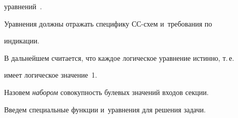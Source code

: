 урав\-не\-ний~\cite{8-pl}.


   


   Уравнения должны отражать специфику СС-схем и~требования по 


индикации.


   


   В дальнейшем считается, что каждое логическое уравнение истинно, т.\,е.\ 


имеет логическое значение~1.


   


   Назовем \textit{набором} совокупность булевых значений входов секции.


   


   Введем специальные функции и~уравнения для решения задачи.


